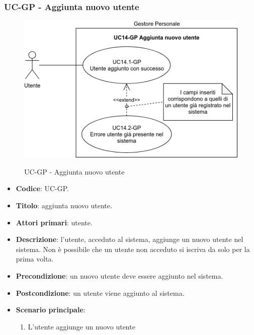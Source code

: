 \subsubsection{UC\theuccount-GP - Aggiunta nuovo utente}
		\begin{figure}[H]
			\centering
				\includegraphics[width=\columnwidth]{img/casi_d'uso/UC14.png}\\
			\caption{UC\theuccount-GP - Aggiunta nuovo utente}
		\end{figure}
	\begin{itemize}
		\item \textbf{Codice}: UC\theuccount-GP.
		\item \textbf{Titolo}: aggiunta nuovo utente.
		\item \textbf{Attori primari}: utente.
		\item \textbf{Descrizione}: l'utente, acceduto al sistema, aggiunge un nuovo utente nel sistema.
		Non è possibile che un utente non acceduto si iscriva da solo per la prima volta.
		\item \textbf{Precondizione}: un nuovo utente deve essere aggiunto nel sistema.
		\item \textbf{Postcondizione}: un utente viene aggiunto al sistema.
		\item \textbf{Scenario principale}:
		\begin{enumerate}
			\item L'utente aggiunge un nuovo utente
		\end{enumerate}
	\end{itemize}
